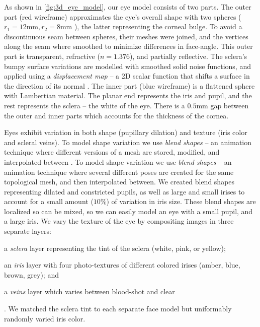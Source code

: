 As shown in \autoref{fig:3d_eye_model}, our eye model consists of two parts.
The outer part (red wireframe) approximates the eye's overall shape with two spheres ($r_1\!=\!12\textrm{mm}, r_2\!=\!8\textrm{mm}$ \cite{ruhland2014look}), the latter representing the corneal bulge.
To avoid a discontinuous seam between spheres, their meshes were joined, and the vertices along the seam where smoothed to minimize differences in face-angle.
This outer part is transparent, refractive ($n\!=\!1.376$), and partially reflective.
The sclera's bumpy surface variations are modelled with smoothed solid noise functions, and applied using a \emph{displacement map} -- a 2D scalar function that shifts a surface in the direction of its normal \cite{lee2000displaced}.
The inner part (blue wireframe) is a flattened sphere with Lambertian material.
The planar end represents the iris and pupil, and the rest represents the sclera -- the white of the eye.
There is a $0.5\textrm{mm}$ gap between the outer and inner parts which accounts for the thickness of the cornea.

Eyes exhibit variation in both shape (pupillary dilation) and texture (iris color and scleral veins).
To model shape variation we use \emph{blend shapes} -- an animation technique where different versions of a mesh are stored, modified, and interpolated between \cite{orvalho2012facial}.
To model shape variation we use \emph{blend shapes} -- an animation technique where several different poses are created for the same topological mesh, and then interpolated between.
We created blend shapes representing dilated and constricted pupils, as well as large and small irises to account for a small amount ($10\%$) of variation in iris size. These blend shapes are localized so can be mixed, so we can easily model an eye with a small pupil, and a large iris.
We vary the texture of the eye by compositing images in three separate layers:
\begin{inparaenum}
\item a \emph{sclera} layer representing the tint of the sclera (white, pink, or yellow);
\item an \emph{iris} layer with four photo-textures of different colored irises (amber, blue, brown, grey); and
\item a \emph{veins} layer which varies between blood-shot and clear
\end{inparaenum}.
We matched the sclera tint to each separate face model but uniformably randomly varied iris color.

